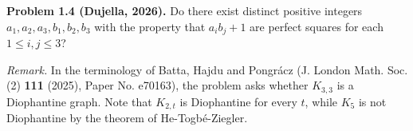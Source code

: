 \textbf{Problem 1.4 (Dujella, 2026).} Do there exist distinct positive integers $a_1, a_2, a_3, b_1, b_2, b_3$ with the property that $a_ib_j + 1$ are perfect squares for each $1 \leqslant i,j \leqslant 3$?

\medskip

\textit{Remark.} In the terminology of Batta, Hajdu and Pongrácz (J. London Math. Soc. (2) \textbf{111} (2025), Paper No. e70163), the problem asks whether $K_{3,3}$ is a Diophantine graph. Note that $K_{2,t}$ is Diophantine for every $t$, while $K_5$ is not Diophantine by the theorem of He-Togbé-Ziegler.
